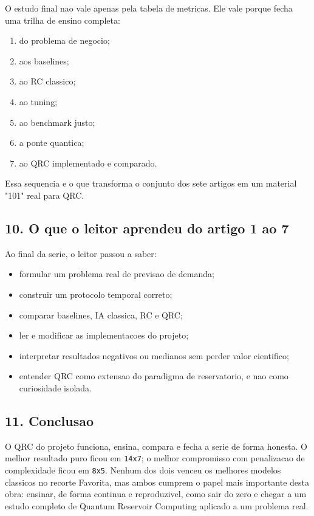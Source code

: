 \documentclass[12pt]{article}
\providecommand{\tightlist}{%
          \setlength{\itemsep}{0pt}\setlength{\parskip}{0pt}}
\begin{document}
O estudo final nao vale apenas pela tabela de metricas. Ele vale porque fecha uma trilha de ensino completa:

\begin{enumerate}
\def\labelenumi{\arabic{enumi}.}
\tightlist
\item
  do problema de negocio;
\item
  aos baselines;
\item
  ao RC classico;
\item
  ao tuning;
\item
  ao benchmark justo;
\item
  a ponte quantica;
\item
  ao QRC implementado e comparado.
\end{enumerate}

Essa sequencia e o que transforma o conjunto dos sete artigos em um material "101" real para QRC.

\subsection{10. O que o leitor aprendeu do artigo 1 ao 7}\label{10-o-que-o-leitor-aprendeu-do-artigo-1-ao-7}

Ao final da serie, o leitor passou a saber:

\begin{itemize}
\tightlist
\item
  formular um problema real de previsao de demanda;
\item
  construir um protocolo temporal correto;
\item
  comparar baselines, IA classica, RC e QRC;
\item
  ler e modificar as implementacoes do projeto;
\item
  interpretar resultados negativos ou medianos sem perder valor cientifico;
\item
  entender QRC como extensao do paradigma de reservatorio, e nao como curiosidade isolada.
\end{itemize}

\subsection{11. Conclusao}\label{11-conclusao}

O QRC do projeto funciona, ensina, compara e fecha a serie de forma honesta. O melhor resultado puro ficou em \texttt{14x7}; o melhor compromisso com penalizacao de complexidade ficou em \texttt{8x5}. Nenhum dos dois venceu os melhores modelos classicos no recorte Favorita, mas ambos cumprem o papel mais importante desta obra: ensinar, de forma continua e reproduzivel, como sair do zero e chegar a um estudo completo de Quantum Reservoir Computing aplicado a um problema real.
\end{document}

